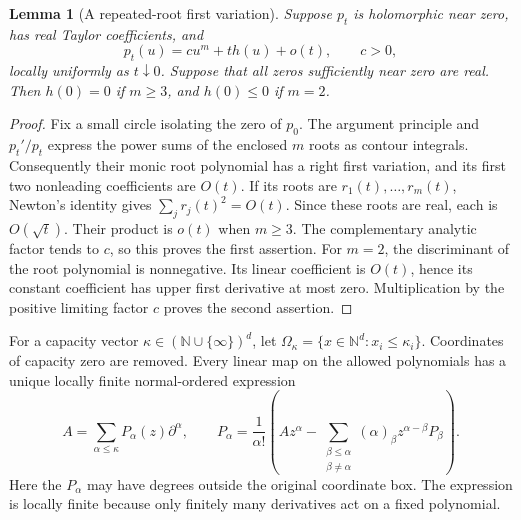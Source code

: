 \documentclass[reqno]{amsart}
\newtheorem{lemma}[theorem]{Lemma}
\theoremstyle{definition}
\theoremstyle{remark}
\newcommand{\N}{\mathbb N}
\begin{document}
\begin{lemma}[A repeated-root first variation]\label{pos:root-contact}
Suppose \(p_t\) is holomorphic near zero, has real Taylor coefficients, and
\[
p_t(u)=c u^m+t h(u)+o(t),\qquad c>0,
\]
locally uniformly as \(t\downarrow0\).  Suppose that all zeros sufficiently near zero
are real.  Then \(h(0)=0\) if \(m\ge3\), and \(h(0)\le0\) if \(m=2\).
\end{lemma}
\begin{proof}
Fix a small circle isolating the zero of \(p_0\).  The argument principle and
\(p_t'/p_t\) express the power sums of the enclosed \(m\) roots as contour integrals.
Consequently their monic root polynomial has a right first variation, and its first
two nonleading coefficients are \(O(t)\).  If its roots are \(r_1(t),\ldots,r_m(t)\),
Newton's identity gives \(\sum_jr_j(t)^2=O(t)\).  Since these roots are real, each is
\(O(\sqrt t)\).  Their product is \(o(t)\) when \(m\ge3\).  The complementary analytic
factor tends to \(c\), so this proves the first assertion.  For \(m=2\), the
discriminant of the root polynomial is nonnegative.  Its linear coefficient is
\(O(t)\), hence its constant coefficient has upper first derivative at most zero.
Multiplication by the positive limiting factor \(c\) proves the second assertion.
\end{proof}

For a capacity vector \(\kappa\in(\N\cup\{\infty\})^d\), let
\(\Omega_\kappa=\{x\in\N^d:x_i\le\kappa_i\}\).  Coordinates of capacity zero are
removed.  Every linear map on the allowed polynomials has a unique locally finite
normal-ordered expression
\begin{equation}\label{pos:normal-recursion}
 A=\sum_{\alpha\le\kappa}P_\alpha(z)\partial^\alpha,
 \qquad
 P_\alpha=\frac1{\alpha!}\left(Az^\alpha-
 \sum_{\substack{\beta\le\alpha\\\beta\ne\alpha}}
 (\alpha)_\beta z^{\alpha-\beta}P_\beta\right).
\end{equation}
Here the \(P_\alpha\) may have degrees outside the original coordinate box.
The expression is locally finite because only finitely many derivatives act on a
fixed polynomial.
\end{document}
